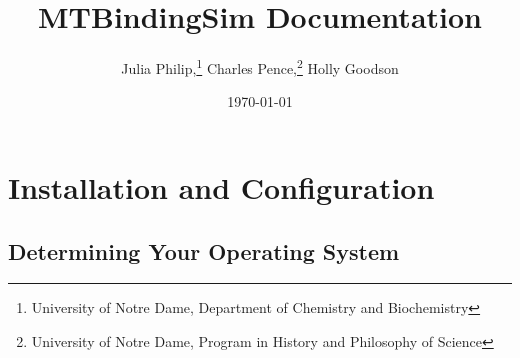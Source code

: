 \documentclass[12pt,oneside,openany]{book}
\begin{document}
\title{MTBindingSim Documentation}
\author{Julia Philip,\thanks{University of Notre Dame, Department of Chemistry 
and Biochemistry} Charles Pence,\thanks{University of Notre Dame, Program in 
History and Philosophy of Science} Holly Goodson\protect\footnotemark[1]}
\date{\today}
\maketitle

\tableofcontents
\clearpage

\part{Installation and Configuration}

\chapter{Determining Your Operating System}

\end{document}
